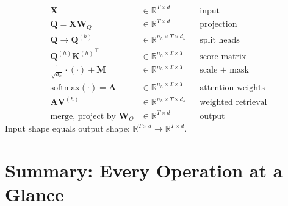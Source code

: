 \documentclass[11pt, a4paper]{article}
\newcommand{\R}{\mathbb{R}}
\newcommand{\mW}{\bm{W}}
\newcommand{\mQ}{\bm{Q}}
\newcommand{\mK}{\bm{K}}
\newcommand{\mV}{\bm{V}}
\newcommand{\mX}{\bm{X}}
\newcommand{\mA}{\bm{A}}
\begin{document}
\begin{formaldef}
\[
\boxed{
\begin{aligned}
\mX &\in \R^{T \times d} & & \text{input} \\
\mQ = \mX \mW_Q &\in \R^{T \times d} & & \text{projection} \\
\mQ \to \mQ^{(h)} &\in \R^{n_h \times T \times d_k} & & \text{split heads} \\
\mQ^{(h)} {\mK^{(h)}}^\top &\in \R^{n_h \times T \times T} & & \text{score matrix} \\
\frac{1}{\sqrt{d_k}} \cdot (\cdot) + \bm{M} &\in \R^{n_h \times T \times T} & & \text{scale + mask} \\
\text{softmax}(\cdot) = \mA &\in \R^{n_h \times T \times T} & & \text{attention weights} \\
\mA \mV^{(h)} &\in \R^{n_h \times T \times d_k} & & \text{weighted retrieval} \\
\text{merge, project by } \mW_O &\in \R^{T \times d} & & \text{output}
\end{aligned}
}
\]
Input shape equals output shape: $\R^{T \times d} \to \R^{T \times d}$.
\end{formaldef}

\section{Summary: Every Operation at a Glance}
\end{document}
